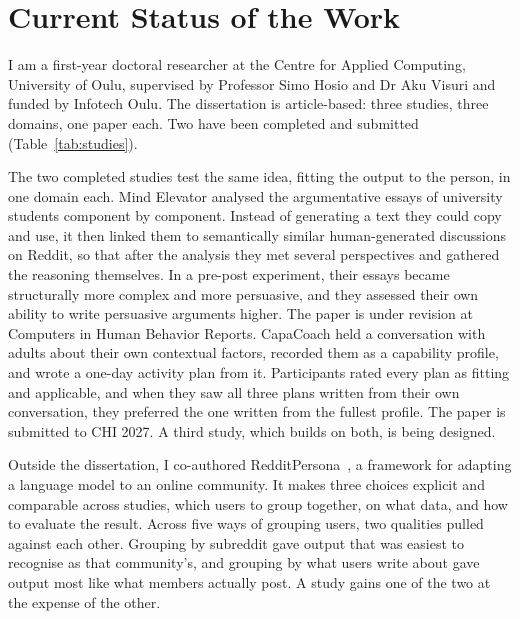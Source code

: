 \documentclass[manuscript,screen,review]{acmart}
\begin{document}

\maketitle

\section{Current Status of the Work}

I am a first-year doctoral researcher at the Centre for Applied Computing, University of Oulu, supervised by Professor Simo Hosio and Dr Aku Visuri and funded by Infotech Oulu. The dissertation is article-based: three studies, three domains, one paper each. Two have been completed and submitted (Table~\ref{tab:studies}).

The two completed studies test the same idea, fitting the output to the person, in one domain each. Mind Elevator analysed the argumentative essays of university students component by component. Instead of generating a text they could copy and use, it then linked them to semantically similar human-generated discussions on Reddit, so that after the analysis they met several perspectives and gathered the reasoning themselves. In a pre-post experiment, their essays became structurally more complex and more persuasive, and they assessed their own ability to write persuasive arguments higher. The paper is under revision at Computers in Human Behavior Reports. CapaCoach held a conversation with adults about their own contextual factors, recorded them as a capability profile, and wrote a one-day activity plan from it. Participants rated every plan as fitting and applicable, and when they saw all three plans written from their own conversation, they preferred the one written from the fullest profile. The paper is submitted to CHI 2027. A third study, which builds on both, is being designed.

Outside the dissertation, I co-authored RedditPersona~\cite{ghaffari2026redditpersona}, a framework for adapting a language model to an online community. It makes three choices explicit and comparable across studies, which users to group together, on what data, and how to evaluate the result. Across five ways of grouping users, two qualities pulled against each other. Grouping by subreddit gave output that was easiest to recognise as that community's, and grouping by what users write about gave output most like what members actually post. A study gains one of the two at the expense of the other.
\end{document}
